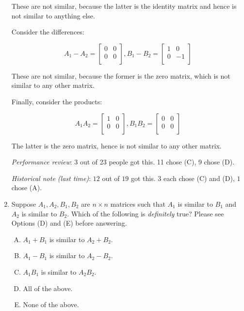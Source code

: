 \documentclass[10pt]{amsart}
\begin{document}
\begin{enumerate}
  These are not similar, because the latter is the identity matrix and
  hence is not similar to anything else.

  Consider the differences:

  $$A_1 - A_2 = \left[\begin{matrix} 0 & 0 \\ 0 & 0 \\\end{matrix}\right], B_1 - B_2 = \left[\begin{matrix} 1 & 0 \\ 0 & -1 \\\end{matrix}\right]$$

  These are not similar, because the former is the zero matrix, which
  is not similar to any other matrix.

  Finally, consider the products:

  $$A_1A_2 = \left[\begin{matrix} 1 & 0 \\ 0 & 0 \\\end{matrix}\right], B_1B_2 = \left[\begin{matrix} 0 & 0 \\ 0 & 0 \\\end{matrix}\right]$$

  The latter is the zero matrix, hence is not similar to any other
  matrix.

  {\em Performance review}: 3 out of 23 people got this. 11 chose (C),
  9 chose (D).

  {\em Historical note (last time)}: $12$ out of $19$ got this. $3$ each chose
  (C) and (D), $1$ chose (A).

\item Suppose $A_1,A_2,B_1,B_2$ are $n \times n$ matrices such that
  $A_1$ is similar to $B_1$ and $A_2$ is similar to $B_2$. Which of
  the following is {\em definitely} true? Please see Options (D) and
  (E) before answering.

  \begin{enumerate}[(A)]
  \item $A_1 + B_1$ is similar to $A_2 + B_2$.
  \item $A_1 - B_1$ is similar to $A_2 - B_2$.
  \item $A_1B_1$ is similar to $A_2B_2$.
  \item All of the above.
  \item None of the above.
  \end{enumerate}


\end{enumerate}
\end{document}
